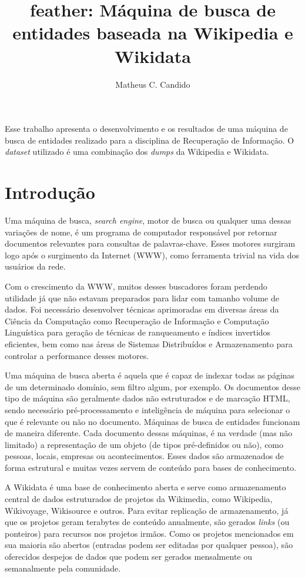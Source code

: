 \documentclass[12pt]{article}
\title{feather: Máquina de busca de entidades baseada na Wikipedia e Wikidata}
\author{Matheus C. Candido\inst{1}}
\begin{document}
 

\maketitle
     
\begin{resumo} 
  Esse trabalho apresenta o desenvolvimento e os resultados de uma máquina de busca de entidades realizado para a disciplina de Recuperação de Informação. O \emph{dataset} utilizado é uma combinação dos \emph{dumps} da Wikipedia e Wikidata.

\end{resumo}

\section{Introdução}

Uma máquina de busca, \emph{search engine}, motor de busca ou qualquer uma dessas variações de nome, é um programa de computador responsável por retornar documentos relevantes para consultas de palavras-chave. Esses motores surgiram logo após o surgimento da Internet (WWW), como ferramenta trivial na vida dos usuários da rede.

Com o crescimento da WWW, muitos desses buscadores foram perdendo utilidade já que não estavam preparados para lidar com tamanho volume de dados. Foi necessário desenvolver técnicas aprimoradas em diversas áreas da Ciência da Computação como Recuperação de Informação e Computação Linguística para geração de técnicas de ranqueamento e índices invertidos eficientes, bem como nas áreas de Sistemas Distribuídos e Armazenamento para controlar a performance desses motores.

Uma máquina de busca aberta é aquela que é capaz de indexar todas as páginas de um determinado domínio, sem filtro algum, por exemplo. Os documentos desse tipo de máquina são geralmente dados não estruturados e de marcação HTML, sendo necessário pré-processamento e inteligência de máquina para selecionar o que é relevante ou não no documento. Máquinas de busca de entidades funcionam de maneira diferente. Cada documento dessas máquinas, é na verdade (mas não limitado) a representação de um objeto (de tipos pré-definidos ou não), como pessoas, locais, empresas ou acontecimentos. Esses dados são armazenados de forma estrutural e muitas vezes servem de conteúdo para bases de conhecimento.

A Wikidata é uma base de conhecimento aberta e serve como armazenamento central de dados estruturados de projetos da Wikimedia, como Wikipedia, Wikivoyage, Wikisource e outros. Para evitar replicação de armazenamento, já que os projetos geram terabytes de conteúdo anualmente, são gerados \emph{links} (ou ponteiros) para recursos nos projetos irmãos. Como os projetos mencionados em sua maioria são abertos (entradas podem ser editadas por qualquer pessoa), são oferecidos despejos de dados que podem ser gerados mensalmente ou semanalmente pela comunidade.
\end{document}
